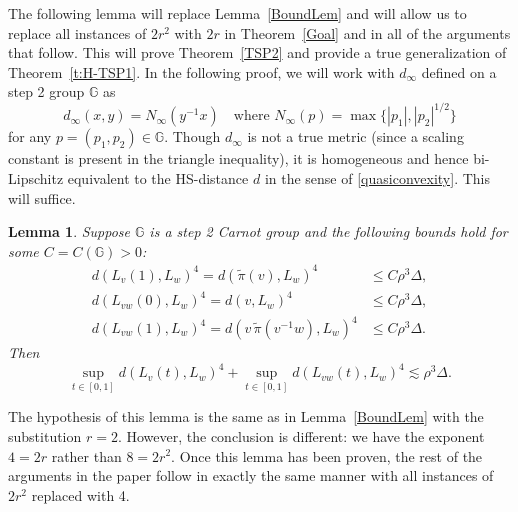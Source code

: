 \documentclass[11pt]{amsart}
\newtheorem{lemma}[theorem]{Lemma}
\theoremstyle{definition}
\numberwithin{theorem}{section} \numberwithin{equation}{section}
\begin{document}
The following lemma will replace Lemma~\ref{BoundLem}
and will allow us to replace all instances of $2r^2$ with $2r$ in Theorem~\ref{Goal} and in all of the arguments that follow.
This will prove Theorem~\ref{TSP2} and provide a true generalization of Theorem~\ref{t:H-TSP1}.
In the following proof, we will work with $d_{\infty}$ defined on a step 2 group $\mathbb{G}$ as
$$
d_{\infty}(x,y) = N_{\infty}(y^{-1}x) \quad \text{where } N_{\infty}(p) = \max\{ |p_1|,|p_2|^{1/2} \}
$$
for any $p=(p_1,p_2) \in \mathbb{G}$.
Though $d_{\infty}$ is not a true metric
(since a scaling constant is present in the triangle inequality),
it is homogeneous and hence bi-Lipschitz equivalent to the HS-distance $d$ in the sense of \eqref{quasiconvexity}.
This will suffice.
\begin{lemma}
\label{BoundLem2}
Suppose $\mathbb{G}$ is a step 2 Carnot group
and the following bounds hold for some $C=C(\mathbb{G})>0$:
\begin{align}
d(L_v(1),L_w)^{4} = d(\tilde{\pi}(v),L_w)^{4} &\leq C\rho^{3} \Delta, \label{i2} \\
d(L_{vw}(0),L_w)^{4} = d(v,L_w)^{4} &\leq C\rho^{3} \Delta, \label{ii2} \\
d(L_{vw}(1),L_w)^{4} = d(v \, \tilde{\pi}( v^{-1} w) ,L_w)^{4} &\leq C\rho^{3} \Delta. \label{iii2}
\end{align}
Then 
$$
\sup_{t \in [0,1]} d(L_v(t),L_w)^{4} + \sup_{t \in [0,1]} d(L_{vw}(t),L_w)^{4}
\lesssim \rho^{3} \Delta.
$$
\end{lemma}
The hypothesis of this lemma is the same as in Lemma~\ref{BoundLem}
with the substitution $r=2$.
However, the conclusion is different:
we have the exponent $4=2r$ rather than $8=2r^2$.
Once this lemma has been proven, 
the rest of the arguments in the paper follow in exactly the same manner
with all instances of $2r^2$ replaced with 4.
\end{document}
